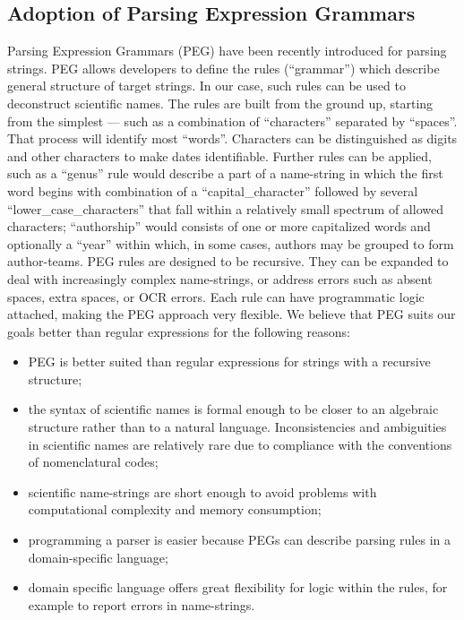 \documentclass{bmcart}
\begin{document}
\subsection*{Adoption of Parsing Expression Grammars}

Parsing Expression Grammars (PEG) \cite{Ford2004} have been recently introduced for parsing strings. PEG allows developers to define the rules (``grammar'') which describe general structure of target strings. In our case, such rules can be used to deconstruct scientific names. The rules are built from the ground up, starting from the simplest --- such as a combination of ``characters'' separated by ``spaces''. That process will identify most ``words''. Characters can be distinguished as digits and other characters to make dates identifiable.  Further rules can be applied, such as a ``genus'' rule would describe a part of a name-string in which the first word begins with combination of a ``capital\_character'' followed by several ``lower\_case\_characters'' that fall within a relatively small spectrum of allowed characters; ``authorship'' would consists of one or more capitalized words and optionally a ``year'' within which, in some cases, authors may be grouped to form author-teams. PEG rules are designed to be recursive. They can be expanded to deal with increasingly complex name-strings, or address errors such as absent spaces, extra spaces, or OCR errors. Each rule can have programmatic logic attached, making the PEG approach very flexible. We believe that PEG suits our goals better than regular expressions for the following reasons:

\begin{itemize}

  \item PEG is better suited than regular expressions for strings with a recursive structure;

  \item the syntax of scientific names is formal enough to be closer to an algebraic structure rather than to a natural language. Inconsistencies and ambiguities in scientific names are relatively rare due to compliance with the conventions of nomenclatural codes;

  \item scientific name-strings are short enough to avoid problems with computational complexity and memory consumption;

  \item programming a parser is easier because PEGs can describe parsing rules in a domain-specific language;

  \item domain specific language offers great flexibility for logic within the rules, for example to report errors in name-strings.

\end{itemize}
\end{document}

